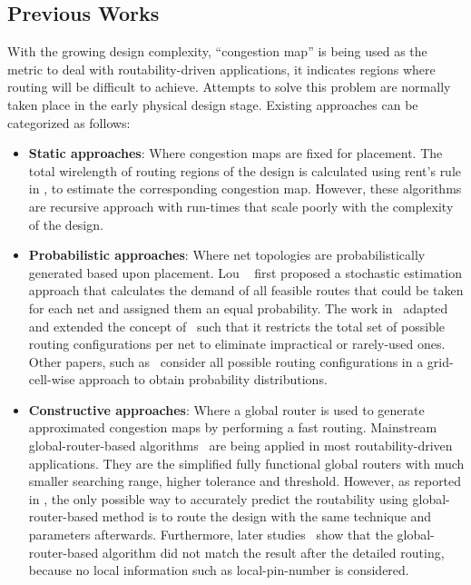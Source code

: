 \subsection{Previous Works}
With the growing design complexity, ``congestion map'' is being used as the metric to deal with routability-driven applications, it indicates regions where routing will be difficult to achieve. Attempts to solve this problem are normally taken place in the early physical design stage. Existing approaches can be categorized as follows:
\begin{itemize}
\item \textbf{Static approaches}: Where congestion maps are fixed for placement. The total wirelength of routing regions of the design is calculated using rent's rule in \cite{rentsrule,rentsrulerecursive}, to estimate the corresponding congestion map. However, these algorithms are recursive approach with run-times that scale poorly with the complexity of the design. 
\item \textbf{Probabilistic approaches}: Where net topologies are probabilistically generated based upon placement.  Lou \etal~\cite{first} first proposed a stochastic estimation approach that calculates the demand of all feasible routes that could be taken for each net and assigned them an equal probability. The work in~\cite{modeling} adapted and extended the concept of~\cite{first} such that it restricts the total set of possible routing configurations per net to eliminate impractical or rarely-used ones. Other papers, such as~\cite{SMD, 3step} consider all possible routing configurations in a grid-cell-wise approach to obtain probability distributions.
\item \textbf{Constructive approaches}: Where a global router is used to generate approximated congestion maps by performing a fast routing.  Mainstream global-router-based algorithms~\cite{mixedsizeplacement,ripple,simplr,nctufast,fastroute} are being applied in most routability-driven applications. They are the simplified fully functional global routers with much smaller searching range, higher tolerance and threshold. However, as reported in \cite{fastroute}, the only possible way to accurately predict the routability using global-router-based method is to route the design with the same technique and parameters afterwards. Furthermore, later studies~\cite{study,ispd14,ispd15} show that the global-router-based algorithm did not match the result after the detailed routing, because no local information such as local-pin-number is considered.

\end{itemize}
